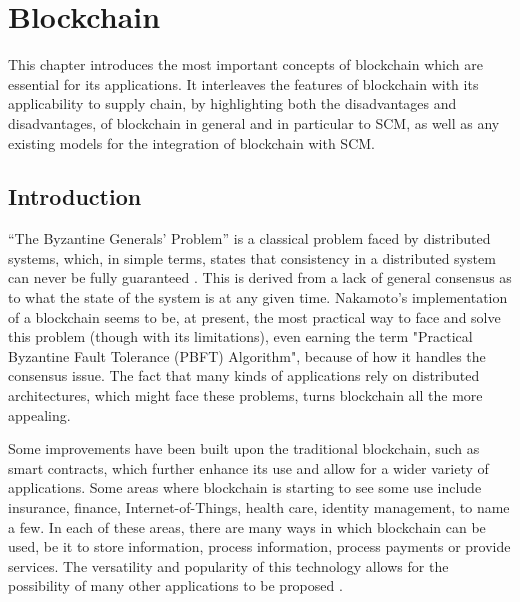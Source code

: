\chapter{Blockchain}
\label{chap:blockchain}


This chapter introduces the most important concepts of blockchain which are essential for its applications. It interleaves the features of blockchain with its applicability to supply chain, by highlighting both the disadvantages and disadvantages, of blockchain in general and in particular to SCM, as well as any existing models for the integration of blockchain with SCM.

    \section{Introduction}
   “The Byzantine Generals' Problem” is a classical problem faced by distributed systems, which, in simple terms, states that consistency in a distributed system can never be fully guaranteed \cite{byzantine-generals-problem}. This is derived from a lack of general consensus as to what the state of the system is at any given time.
   Nakamoto's implementation of a blockchain seems to be, at present, the most practical way to face and solve  this problem (though with its limitations), even earning the term "Practical Byzantine Fault Tolerance (PBFT) Algorithm", because of how it handles the consensus issue. The fact that many kinds of applications rely on distributed architectures, which might face these problems, turns blockchain all the more appealing. 
   
   Some improvements have been built upon the traditional blockchain, such as smart contracts, which further enhance its use and allow for a wider variety of applications. Some areas where blockchain is starting to see some use include insurance, finance, Internet-of-Things, health care, identity management, to name a few. 
   In each of these areas, there are many ways in which blockchain can be used, be it to store information, process information, process payments or provide services. The versatility and popularity of this technology allows for the possibility of many other applications to be proposed .

